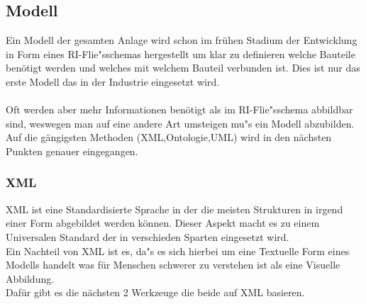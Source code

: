 \subsection{Modell}
Ein Modell der gesamten Anlage wird schon im frühen Stadium der Entwicklung in Form eines RI-Flie"sschemas hergestellt um klar zu definieren welche Bauteile benötigt werden und welches mit welchem Bauteil verbunden ist. Dies ist nur das erste Modell das in der Industrie eingesetzt wird.\\
\\
Oft werden aber mehr Informationen benötigt als im RI-Flie"sschema abbildbar sind, weswegen man auf eine andere Art umsteigen mu"s ein Modell abzubilden.\\
Auf die gängigsten Methoden (XML,Ontologie,UML) wird in den nächsten Punkten genauer eingegangen.
\subsubsection{XML}
XML ist eine Standardisierte Sprache in der die meisten Strukturen in irgend einer Form abgebildet werden können. Dieser Aspekt macht es zu einem Universalen Standard der in verschieden Sparten eingesetzt wird.\\
Ein Nachteil von XML ist es, da"s es sich hierbei um eine Textuelle Form eines Modells handelt was für Menschen schwerer zu verstehen ist als eine Visuelle Abbildung.\\
Dafür gibt es die nächsten 2 Werkzeuge die beide auf XML basieren.
